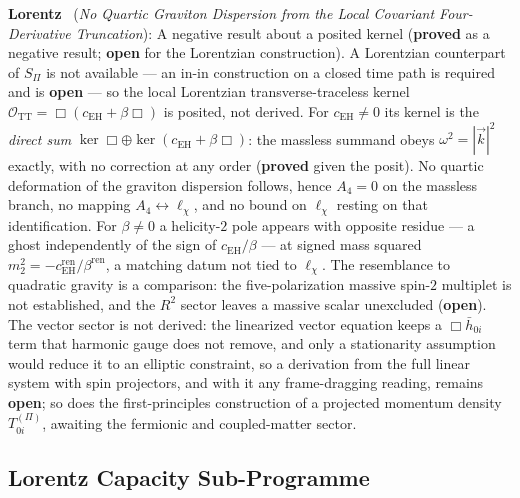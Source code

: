 \documentclass[11pt,a4paper]{article}
\newcommand{\sproved}{\textcolor{cproved}{\textbf{proved}}}
\newcommand{\sopen}{\textcolor{copen}{\textbf{open}}}
\begin{document}
    \textbf{Lorentz}~\cite{Beau2026i} (\emph{No Quartic Graviton Dispersion from the Local Covariant
    Four-Derivative Truncation}): A negative result about a posited kernel (\sproved{} as a negative result;
    \sopen{} for the Lorentzian construction). A Lorentzian counterpart of $S_\Pi$
    is not available --- an in-in construction on a closed time path is required and is \sopen{} --- so the local
    Lorentzian transverse-traceless kernel $\mathcal{O}_{\mathrm{TT}} = \Box(c_{\mathrm{EH}} + \beta\Box)$ is posited,
    not derived.
    For $c_{\mathrm{EH}} \neq 0$ its kernel is the \emph{direct sum} $\ker\Box \oplus \ker(c_{\mathrm{EH}}+\beta\Box)$:
    the massless summand obeys $\omega^2 = |\vec k|^2$ exactly, with no correction at any order (\sproved{} given
    the posit). No quartic deformation of the graviton dispersion follows, hence $A_4 = 0$ on the massless branch,
    no mapping $A_4 \leftrightarrow \ell_\chi$, and no bound on $\ell_\chi$ resting on that identification.
    For $\beta \neq 0$ a helicity-$2$ pole appears with opposite residue --- a ghost independently of the sign of
    $c_{\mathrm{EH}}/\beta$ --- at signed mass squared $m_2^2 = -c_{\mathrm{EH}}^{\mathrm{ren}}/\beta^{\mathrm{ren}}$,
    a matching datum not tied to $\ell_\chi$. The resemblance to quadratic gravity is a comparison: the
    five-polarization
    massive spin-$2$ multiplet is not established, and the $R^2$ sector leaves a massive scalar unexcluded (\sopen).
    The vector sector is not derived: the linearized vector equation keeps a $\Box\bar h_{0i}$ term that
    harmonic gauge does not remove, and only a stationarity assumption would reduce it to an elliptic
    constraint, so a derivation from the full linear system with spin projectors, and with it any
    frame-dragging reading, remains \sopen; so does the first-principles construction of a projected
    momentum density $T^{(\Pi)}_{0i}$, awaiting the fermionic and coupled-matter sector.

  \subsection{Lorentz Capacity Sub-Programme}
\end{document}
